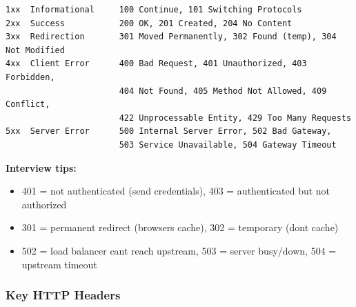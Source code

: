 \documentclass[11pt]{article}
\providecommand{\tightlist}{\setlength{\itemsep}{1pt}\setlength{\parskip}{0pt}}
\begin{document}
\setcodelang{}

\begin{verbatim}
1xx  Informational     100 Continue, 101 Switching Protocols
2xx  Success           200 OK, 201 Created, 204 No Content
3xx  Redirection       301 Moved Permanently, 302 Found (temp), 304 Not Modified
4xx  Client Error      400 Bad Request, 401 Unauthorized, 403 Forbidden,
                       404 Not Found, 405 Method Not Allowed, 409 Conflict,
                       422 Unprocessable Entity, 429 Too Many Requests
5xx  Server Error      500 Internal Server Error, 502 Bad Gateway,
                       503 Service Unavailable, 504 Gateway Timeout
\end{verbatim}

\textbf{Interview tips:}

\begin{itemize}
\tightlist
\item
  401 = not authenticated (send credentials), 403 = authenticated but not authorized
\item
  301 = permanent redirect (browsers cache), 302 = temporary (don\textquotesingle t cache)
\item
  502 = load balancer can\textquotesingle t reach upstream, 503 = server busy/down, 504 = upstream timeout
\end{itemize}

\subsubsection{Key HTTP Headers}\label{key-http-headers}

\end{document}
